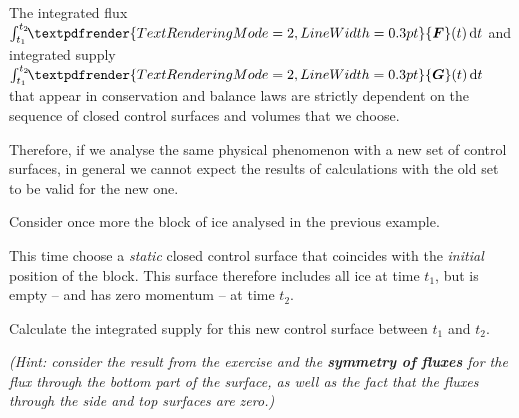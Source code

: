 \documentclass[a4paper,12pt,%
onecolumn,oneside,titlepage,%
british%
]{memoir}
\renewcommand*{\bm}[1]{\textpdfrender{TextRenderingMode=2,LineWidth=0.3pt}{\boldsymbol{#1}}}
\newcommand*{\di}{\mathrm{d}}%
\renewcommand*{\|}[1][]{\nonscript\:#1\vert\nonscript\:\mathopen{}}
\newcommand*{\yF}{\bm{F}}
\newcommand*{\yG}{\bm{G}}
\begin{document}
\begin{warning}
  The integrated flux $\int_{t_{1}}^{t_{2}}\!\!\yF(t)\,\di t$ and integrated supply $\int_{t_{1}}^{t_{2}}\!\!\yG(t)\,\di t$ that appear in conservation and balance laws are strictly dependent on the sequence of closed control surfaces and volumes that we choose.

  Therefore, if we analyse the same physical phenomenon with a new set of control surfaces, in general we cannot expect the results of calculations with the old set to be valid for the new one.
\end{warning}

\bigskip

\begin{exercise}
  Consider once more the block of ice analysed in the previous example.

  This time choose a \emph{static} closed control surface that coincides with the \emph{initial} position of the block. This surface therefore includes all ice at time $t_{1}$, but is empty -- and has zero momentum -- at time $t_{2}$.

  Calculate the integrated supply for this new control surface between $t_{1}$ and $t_{2}$.

  \emph{(Hint: consider the result from the exercise and  the \textbf{symmetry of fluxes} for the flux through the bottom part of the surface, as well as the fact that the fluxes through the side and top surfaces are zero.)}
\end{exercise}

\bigskip
\end{document}
